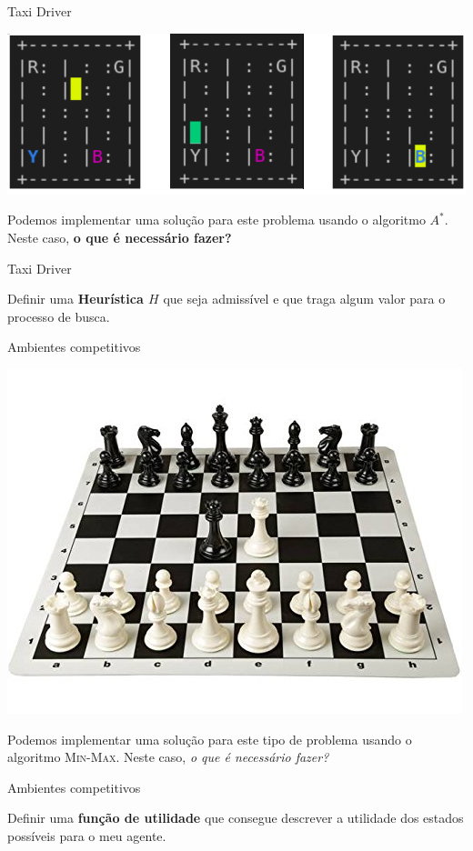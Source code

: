 \documentclass{beamer}
\begin{document}
\begin{frame}{Taxi Driver}

	\begin{center}
		\includegraphics[width=.8\textwidth]{figuras/taxi_driver.png}
	\end{center}

	Podemos implementar uma solução para este problema usando o algoritmo $A^{*}$. Neste caso, 
	\textbf{o que é necessário fazer?}

\end{frame}

\begin{frame}{Taxi Driver}

	Definir uma \textbf{Heurística $H$} que seja admissível e que traga algum valor para o 
	processo de busca.

\end{frame}

\begin{frame}{Ambientes competitivos}

	\begin{center}
		\includegraphics[width=.6\textwidth]{figuras/chess.jpg}
	\end{center}

	Podemos implementar uma solução para este tipo de problema usando o algoritmo 
	\textsc{Min-Max}. Neste caso, \emph{o que é necessário fazer?}

\end{frame}

\begin{frame}{Ambientes competitivos}

	Definir uma \textbf{função de utilidade} que consegue descrever a utilidade dos estados possíveis para o meu agente.


\end{frame}
\end{document}
